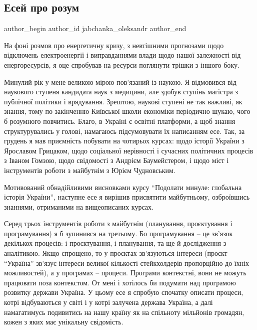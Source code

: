  
 
 
 
 
 
\subsection{Есей про розум}
\label{sec:24_01_2022.stz.news.ua.zbruc.1.esej_pro_rozum}
 
\ifcmt
 author_begin
   author_id jabchanka_oleksandr
 author_end
\fi

\begin{zznagolos}
На фоні розмов про енергетичну кризу, з невтішними прогнозами щодо відключень
електроенергії і виправданнями влади щодо нашої залежності від енергоресурсів,
я оце спробував на ресурси поглянути трішки з іншого боку.  	
\end{zznagolos}

Минулий рік у мене великою мірою пов’язаний із наукою. Я відмовився від
наукового ступеня кандидата наук з медицини, але здобув ступінь магістра з
публічної політики і врядування. Зрештою, наукові ступені не так важливі, як
знання, тому по закінченню Київської школи економіки періодично шукаю, чого б
розумного повчитись. Благо, в Україні є освітні платформи, а щоб знання
структурувались у голові, намагаюсь підсумовувати їх написанням есе. Так, за
грудень я мав приємність побувати на чотирьох курсах: щодо історії України з
Ярославом Грицаком, щодо соціальної нерівності і сучасних політичних процесів з
Іваном Гомзою, щодо свідомості з Андрієм Баумейстером, і щодо міст і
інструментів роботи з майбутнім з Юрієм Чудновським.


Мотивований обнадійливими висновками курсу \enquote{Подолати минуле: глобальна
історія України}, наступне есе я вирішив присвятити майбутньому, озброївшись
знаннями, отриманими на вищеописаних курсах.

Серед трьох інструментів роботи з майбутнім (планування, проєктування і
програмування) я б зупинився на третьому. Бо програмування – це зв’язок
декількох процесів: і проєктування, і планування, та ще й дослідження з
аналітикою. Якщо спрощено, то у проєктах зв’язуються інтереси (проєкт \enquote{Україна}
зв’язує інтереси великої кількості стейкхолдерів пропорційно до їхніх
можливостей), а у програмах – процеси. Програми контекстні, вони не можуть
працювати поза контекстом. От мені і хотілось би подумати над програмою
розвитку держави Україна. У цьому есе я спробую спочатку описати процеси, котрі
відбуваються у світі і у котрі залучена держава Україна, а далі намагатимусь
подивитись на нашу країну як на спільноту мільйонів громадян, кожен з яких має
унікальну свідомість.


